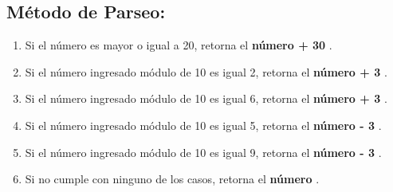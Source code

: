 \documentclass[12pt,a4paper]{article}
\begin{document}
\subsection{M\'etodo de Parseo:}
\begin{enumerate}
\item Si el n\'umero es mayor o igual a 20, retorna el {\bf n\'umero + 30 }.
\item Si el n\'umero ingresado m\'odulo de 10 es igual 2, retorna el {\bf n\'umero + 3 }.
\item Si el n\'umero ingresado m\'odulo de 10 es igual 6, retorna el {\bf n\'umero + 3 }.
\item Si el n\'umero ingresado m\'odulo de 10 es igual 5, retorna el {\bf n\'umero - 3 }.
\item Si el n\'umero ingresado m\'odulo de 10 es igual 9, retorna el {\bf n\'umero - 3 }.
\item Si no cumple con ninguno de los casos, retorna el {\bf n\'umero }.
\end{enumerate}
\end{document}
